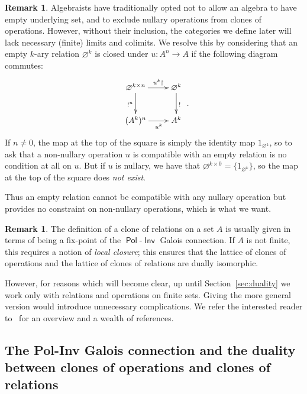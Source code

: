 \documentclass[11pt, a4paper, twoside,leqno]{amsart}
\newcommand{\cd}[2][]{\vcenter{\hbox{\xymatrix#1{#2}}}}
\numberwithin{equation}{section}
\theoremstyle{plain}
\theoremstyle{definition}
\newtheorem{Rk}[Thm]{Remark}
\renewcommand{\emptyset}{\varnothing}
\DeclareMathOperator{\Pol}{\mathsf{Pol}}
\DeclareMathOperator{\Inv}{\mathsf{Inv}}
\renewcommand{\emptyset}{\varnothing}
\begin{document}
\begin{Rk}
  \label{rk:es-nullaries}
  Algebraists have traditionally opted not to allow an algebra to have
  empty underlying set, and to exclude nullary
  operations from clones of operations. However, without their inclusion, the categories we define
  later will lack necessary (finite) limits and colimits. We resolve
  this by considering that an empty \(k\)-ary relation \(\emptyset{}^{k}\)
  is closed under \(u \colon A^{n} \rightarrow A\)  if the following
  diagram commutes:
  \begin{equation*}
    \cd{
      {\emptyset{}^{k\times n}} \ar[r]^-{u^{k}\upharpoonright}
      \ar[d]_{!^{n}} &
      {\emptyset{}^{k}} \ar[d]^{!} \\
      {(A^{k})^{n}} \ar[r]_-{u^{k}} &
      {A^{k}}
    } \rlap{ .}
  \end{equation*}
  If \(n \neq 0\), the map at the top of the
  square is simply the identity map \(1_{\emptyset{}^{k}}\), so to ask
  that a non-nullary operation \(u\) is compatible with an empty
  relation is no condition at all on \(u\).
  But if \(u\) is nullary, we have that \(\emptyset{}^{k\times 0} = \{1_{\emptyset{}^{k}}\}\), so the
  map at the top of the square does {\it not exist}.

  Thus an empty relation cannot be compatible with any nullary
  operation but provides no constraint on non-nullary operations, which is what we
  want.
\end{Rk}

\begin{Rk}
  \label{rk:finite-vs-non}
  The definition of a clone of relations on a set \(A\) is usually given
  in terms of
  being a fix-point of the \(\Pol\)-\(\Inv\) Galois connection. If \(A\) is not finite, this requires a notion of
  \emph{local closure}; this ensures that the lattice of clones of
  operations and the lattice of clones of relations are dually isomorphic. 

  However, for reasons which will become clear, up until
  Section~\ref{sec:duality} we work only with relations and operations on
  finite sets. Giving the more general version would introduce
  unnecessary complications. We refer the interested reader
  to~\cite{Kerkhoff:2014aa} for an overview and a wealth of references.
\end{Rk}



\subsection{The Pol-Inv Galois connection and the duality between
  clones of operations and clones of relations}
\label{sec:pol-inv-galois}
\end{document}
